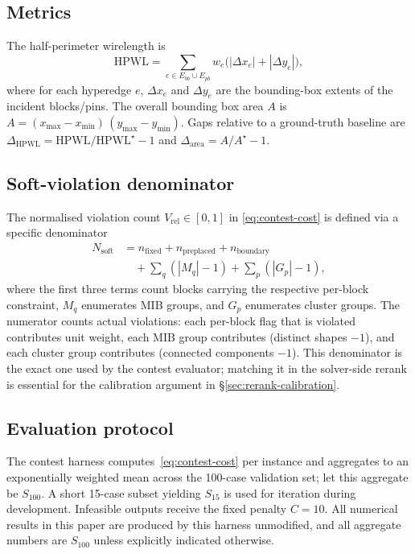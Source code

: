 \documentclass[nolineno]{ieeeaccess}
\begin{document}
\subsection{Metrics}
The half-perimeter wirelength is
\begin{equation}
    \text{HPWL} = \sum_{e\in E_{bb}\cup E_{pb}} w_e\bigl(|\Delta x_e| + |\Delta y_e|\bigr),
\end{equation}
where for each hyperedge $e$, $\Delta x_e$ and $\Delta y_e$ are the
bounding-box extents of the incident blocks/pins. The overall bounding
box area $A$ is
$A = (x_{\max} - x_{\min})\,(y_{\max} - y_{\min})$.
Gaps relative to a ground-truth baseline are
$\Delta_{\text{HPWL}} = \text{HPWL} / \text{HPWL}^{\star} - 1$ and
$\Delta_{\text{area}} = A / A^{\star} - 1$.

\subsection{Soft-violation denominator}
The normalised violation count $V_{\text{rel}}\in[0,1]$ in
\eqref{eq:contest-cost} is defined via a specific denominator
\begin{equation}
\begin{aligned}
N_{\text{soft}} &= n_{\text{fixed}} + n_{\text{preplaced}} + n_{\text{boundary}}\\
&\quad + \sum_q (|M_q| - 1) + \sum_p (|G_p| - 1),
\end{aligned}
\label{eq:nsoft}
\end{equation}
where the first three terms count blocks carrying the respective
per-block constraint, $M_q$ enumerates MIB groups, and $G_p$
enumerates cluster groups. The numerator counts actual violations:
each per-block flag that is violated contributes unit weight, each
MIB group contributes (distinct shapes $- 1$), and each cluster group
contributes (connected components $- 1$). This denominator is the
exact one used by the contest evaluator; matching it in the
solver-side rerank is essential for the calibration argument in
\S\ref{sec:rerank-calibration}.

\subsection{Evaluation protocol}
The contest harness computes~\eqref{eq:contest-cost} per instance and
aggregates to an exponentially weighted mean across the 100-case
validation set; let this aggregate be $S_{100}$. A short 15-case
subset yielding $S_{15}$ is used for iteration during development.
Infeasible outputs receive the fixed penalty $C=10$. All numerical
results in this paper are produced by this harness unmodified, and all
aggregate numbers are $S_{100}$ unless explicitly indicated otherwise.
\end{document}
